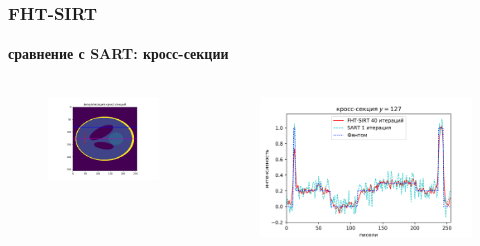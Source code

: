\documentclass[12pt]{beamer}
\begin{document}
\begin{frame}
\frametitle{FHT-SIRT}
\framesubtitle{сравнение с SART: кросс-секции}
\begin{columns}[T,onlytextwidth]
  \hspace*{-1cm}
  \begin{column}{0.2\textwidth}
    \begin{figure}
      \centering
      \vspace{1.5cm}
      \includegraphics[width=1.5\textwidth]{cs_viz}
    \end{figure}
  \end{column}
  \begin{column}{0.8\textwidth}
    \begin{figure}
      \centering
      \vspace{-1cm}
      \includegraphics[width=1.2\textwidth]{cs_127}
    \end{figure}
  \end{column}
\end{columns}
\end{frame}
\end{document}
